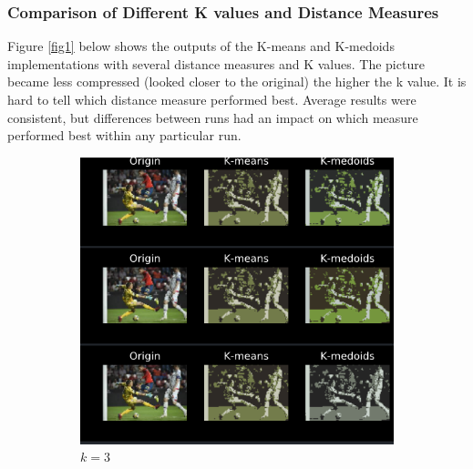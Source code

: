 \documentclass[a4paper]{article}
\begin{document}
\subsubsection{Comparison of Different K values and Distance Measures}
 Figure \ref{fig1} below shows the outputs of the K-means and K-medoids implementations with several distance measures and K values. The picture became less compressed (looked closer to the original) the higher the k value.  It is hard to tell which distance measure performed best.  Average results were consistent, but differences between runs had an impact on which measure performed best within any particular run.
	\begin{figure}[h]
		
    \centering
    \begin{subfigure}[b]{0.3\textwidth}
        \includegraphics[width=\textwidth]{k_3.png}
        \caption{$k=3$}
        \label{fig:k_3}
    \end{subfigure}
    \begin{subfigure}[b]{0.3\textwidth}

\end{subfigure}
\end{figure}
\end{document}
